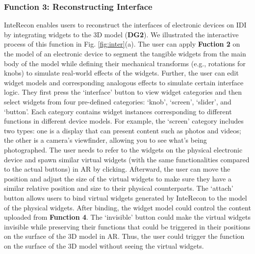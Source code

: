 \subsubsection{Function 3: Reconstructing Interface}
InteRecon enables users to reconstruct the interfaces of electronic devices on IDI by integrating widgets to the 3D model (\textbf{DG2}). 
We illustrated the interactive process of this function in Fig. \ref{fig:inter}(a). 
The user can apply \textbf{Fuction 2} on the model of an electronic device to segment the tangible widgets from the main body of the model while defining their mechanical transforms (e.g., rotations for knobs) to simulate real-world effects of the widgets. 
Further, the user can edit widget models and corresponding analogous effects to simulate certain interface logic. They first press the `interface' button to view widget categories and then select widgets from four pre-defined categories: `knob', `screen', `slider', and `button'. 
Each category contains widget instances corresponding to different functions in different device models. 
For example, the `screen' category includes two types: one is a display that can present content such as photos and videos; the other is a camera's viewfinder, allowing you to see what's being photographed.
The user needs to refer to the widgets on the physical electronic device and spawn similar virtual widgets (with the same functionalities compared to the actual buttons) in AR by clicking. 
Afterward, the user can move the position and adjust the size of the virtual widgets to make sure they have a similar relative position and size to their physical counterparts.
The `attach' button allows users to bind virtual widgets generated by InteRecon to the model of the physical widgets.
After binding, the widget model could control the content uploaded from \textbf{Function 4}.
The `invisible' button could make the virtual widgets invisible while preserving their functions that could be triggered in their positions on the surface of the 3D model in AR. 
Thus, the user could trigger the function on the surface of the 3D model without seeing the virtual widgets.





